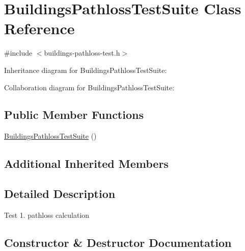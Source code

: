 \hypertarget{classBuildingsPathlossTestSuite}{}\section{Buildings\+Pathloss\+Test\+Suite Class Reference}
\label{classBuildingsPathlossTestSuite}


{\ttfamily \#include $<$buildings-\/pathloss-\/test.\+h$>$}



Inheritance diagram for Buildings\+Pathloss\+Test\+Suite\+:


Collaboration diagram for Buildings\+Pathloss\+Test\+Suite\+:
\subsection*{Public Member Functions}
\begin{DoxyCompactItemize}
\item 
\hyperlink{classBuildingsPathlossTestSuite_a0fa7d83d42949e53a1c5833467f994cd}{Buildings\+Pathloss\+Test\+Suite} ()
\end{DoxyCompactItemize}
\subsection*{Additional Inherited Members}


\subsection{Detailed Description}
Test 1. pathloss calculation 

\subsection{Constructor \& Destructor Documentation}
